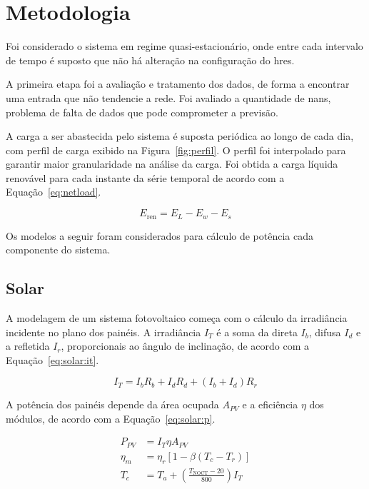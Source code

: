 \clearpage

\section{Metodologia}

Foi considerado o sistema em regime quasi-estacionário, onde entre cada intervalo
de tempo é suposto que não há alteração na configuração do \acrshort{hres}.

A primeira etapa foi a avaliação e tratamento dos dados, de forma a encontrar
uma entrada que não tendencie a rede. Foi avaliado a quantidade de
\acrshort{nan}s, problema de falta de dados que pode comprometer a previsão.

A carga a ser abastecida pelo sistema é suposta periódica ao longo de cada dia,
com perfil de carga exibido na Figura~\ref{fig:perfil}. O perfil foi interpolado
para garantir maior granularidade na análise da carga. Foi obtida a
carga líquida renovável para cada instante da série temporal de acordo com a
Equação~\ref{eq:netload}.

\begin{equation}
  \label{eq:netload}   E_{\text{ren}} = E_L - E_w - E_s
\end{equation}



Os modelos a seguir foram considerados para cálculo de potência cada componente
do sistema.

\subsection{Solar}

A modelagem de um sistema fotovoltaico começa com o cálculo da irradiância
incidente no plano dos painéis. A irradiância $I_{T}$ é a soma da direta
$I_{b}$, difusa $I_{d}$ e a refletida $I_{r}$, proporcionais ao ângulo de
inclinação, de acordo com a Equação~\ref{eq:solar:it}.

\begin{equation}
  \label{eq:solar:it}   I_T = I_b R_b + I_d R_d + (I_b + I_d) R_r
\end{equation}

A potência dos painéis depende da área ocupada $A_{PV}$ e a eficiência $\eta$
dos módulos, de acordo com a Equação~\ref{eq:solar:p}.

\begin{align}
  \label{eq:solar:p}    P_{PV} &= I_T \eta A_{PV} \\
  \label{eq:solar:etam}    \eta_m &= \eta_r [1 - \beta (T_c - T_r)] \\
  \label{eq:solar:tc}   T_c &= T_a + \left(\frac{T_{\text{NOCT}}-20}{800}\right) I_T
\end{align}

